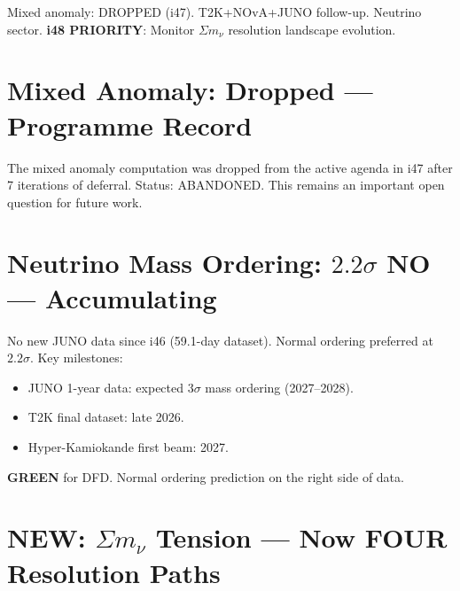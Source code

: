 \documentclass[11pt,a4paper]{article}
\newcommand{\GREEN}{\textcolor{dfdgreen}{\textbf{GREEN}}}
\newcommand{\NEW}{\textcolor{dfdblue}{\textbf{NEW}}}
\begin{document}
Mixed anomaly: DROPPED (i47). T2K+NOvA+JUNO follow-up. Neutrino sector. \textbf{i48 PRIORITY}: Monitor $\Sigma m_\nu$ resolution landscape evolution.

\section{Mixed Anomaly: Dropped --- Programme Record}

The mixed anomaly computation was dropped from the active agenda in i47 after 7 iterations of deferral. Status: ABANDONED. This remains an important open question for future work.

\section{Neutrino Mass Ordering: $2.2\sigma$ NO --- Accumulating}

No new JUNO data since i46 (59.1-day dataset). Normal ordering preferred at $2.2\sigma$. Key milestones:
\begin{itemize}
\item JUNO 1-year data: expected $3\sigma$ mass ordering (2027--2028).
\item T2K final dataset: late 2026.
\item Hyper-Kamiokande first beam: 2027.
\end{itemize}

\GREEN{} for DFD. Normal ordering prediction on the right side of data.

\section{\NEW: $\Sigma m_\nu$ Tension --- Now FOUR Resolution Paths}
\end{document}

